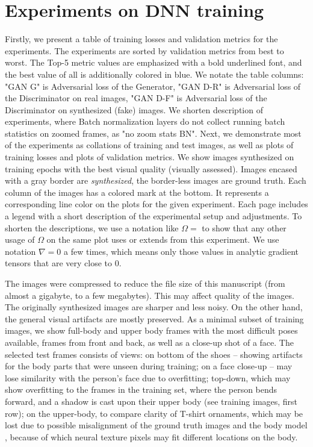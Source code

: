 \clearpage
\newpage

\section{Experiments on DNN training}
\label{appb:exps}

Firstly, we present a table of training losses and validation metrics for the experiments. The experiments are sorted by validation metrics from best to worst. The Top-5 metric values are emphasized with a bold underlined font, and the best value of all is additionally colored in blue. We notate the table columns: "GAN G" is Adversarial loss of the Generator, "GAN D-R" is Adversarial loss of the Discriminator on real images, "GAN D-F" is Adversarial loss of the Discriminator on synthesized (fake) images. We shorten description of experiments, where Batch normalization layers do not collect running batch statistics on zoomed frames, as "no zoom stats BN". Next, we demonstrate most of the experiments as collations of training and test images, as well as plots of training losses and plots of validation metrics. We show images synthesized on training epochs with the best visual quality (visually assessed). Images encased with a gray border are \textit{synthesized}, the border-less images are ground truth. Each column of the images has a colored mark at the bottom. It represents a corresponding line color on the plots for the given experiment. Each page includes a legend with a short description of the experimental setup and adjustments. To shorten the descriptions, we use a notation like $\Omega=$ to show that any other usage of $\Omega$ on the same plot uses or extends from this experiment. We use notation $\nabla=0$ a few times, which means only those values in analytic gradient tensors that are very close to 0.

The images were compressed to reduce the file size of this manuscript (from almost a gigabyte, to a few megabytes). This may affect quality of the images. The originally synthesized images are sharper and less noisy. On the other hand, the general visual artifacts are mostly preserved. As a minimal subset of training images, we show full-body and upper body frames with the most difficult poses available, frames from front and back, as well as a close-up shot of a face. The selected test frames consists of views: on bottom of the shoes -- showing artifacts for the body parts that were unseen during training; on a face close-up -- may lose similarity with the person's face due to overfitting; top-down, which may show overfitting to the frames in the training set, where the person bends forward, and a shadow is cast upon their upper body (see training images, first row); on the upper-body, to compare clarity of T-shirt ornaments, which may be lost due to possible misalignment of the ground truth images and the body model \cite{dnn:smplx19}, because of which neural texture pixels may fit different locations on the body.

